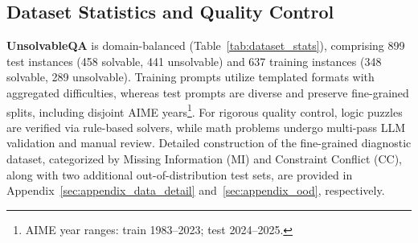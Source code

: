 \subsection{Dataset Statistics and Quality Control}
\textbf{UnsolvableQA} is domain-balanced (Table~\ref{tab:dataset_stats}), comprising 899 test instances (458 solvable, 441 unsolvable) and 637 training instances (348 solvable, 289 unsolvable). Training prompts utilize templated formats with aggregated difficulties, whereas test prompts are diverse and preserve fine-grained splits, including disjoint AIME years\footnote{AIME year ranges: train 1983--2023; test 2024--2025.}. For rigorous quality control, logic puzzles are verified via rule-based solvers, while math problems undergo multi-pass LLM validation and manual review. Detailed construction of the fine-grained diagnostic dataset, categorized by Missing Information (MI) and Constraint Conflict (CC), along with two additional out-of-distribution test sets, are provided in Appendix~\ref{sec:appendix_data_detail} and~\ref{sec:appendix_ood}, respectively.
